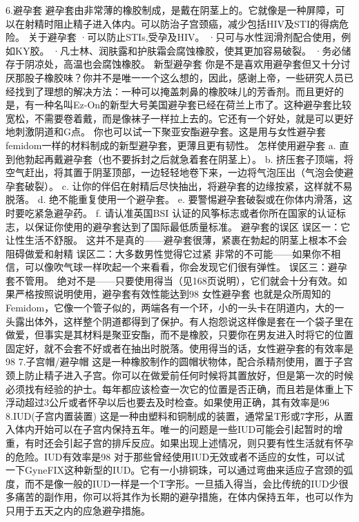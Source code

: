 \documentclass[12pt,UTF8]{ctexbook}
\begin{document}
6.避孕套
避孕套由非常薄的橡胶制成，是戴在阴茎上的。它就像是一种屏障，可以在射精时阻止精子进入体内。可以防治子宫颈癌，减少包括HIV及STI的得病危险。
关于避孕套
·可以防止STIs,受孕及HIV。
·只可与水性润滑剂配合使用，例如KY胶。
·凡士林、润肤露和护肤霜会腐蚀橡胶，使其更加容易破裂。
·务必储存于阴凉处，高温也会腐蚀橡胶。
新型避孕套
你是不是喜欢用避孕套但又十分讨厌那股子橡胶味？你并不是唯一一个这么想的，因此，感谢上帝，一些研究人员已经找到了理想的解决方法：一种可以掩盖刺鼻的橡胶味儿的芳香剂。而且更好的是，有一种名叫Ez-On的新型大号美国避孕套已经在荷兰上市了。这种避孕套比较宽松，不需要卷着戴，而是像袜子一样拉上去的。它还有一个好处，就是可以更好地刺激阴道和G点。
你也可以试一下聚亚安酯避孕套。这是用与女性避孕套femidom一样的材料制成的新型避孕套，更薄且更有韧性。
怎样使用避孕套
a. 直到他勃起再戴避孕套（也不要拆封之后就急着套在阴茎上）。
b. 挤压套子顶端，将空气赶出，将其置于阴茎顶部，一边轻轻地卷下来，一边将气泡压出（气泡会使避孕套破裂）。
c. 让你的伴侣在射精后尽快抽出，将避孕套的边缘按紧，这样就不易脱落。
d. 绝不能重复使用一个避孕套。
e. 要警惕避孕套破裂或在你体内滑落，这时要吃紧急避孕药。
f. 请认准英国BSI 认证的风筝标志或者你所在国家的认证标志，以保证你使用的避孕套达到了国际最低质量标准。
避孕套的误区
误区一：它让性生活不舒服。
这并不是真的——避孕套很薄，紧裹在勃起的阴茎上根本不会阻碍做爱和射精
误区二：大多数男性觉得它过紧
非常的不可能——如果你不相信，可以像吹气球一样吹起一个来看看，你会发现它们很有弹性。
误区三：避孕套不管用。
绝对不是——只要使用得当（见168页说明），它们就会十分有效。如果严格按照说明使用，避孕套有效性能达到98%
女性避孕套
也就是众所周知的Femidom，它像一个管子似的，两端各有一个环，小的一头卡在阴道内，大的一头露出体外，这样整个阴道都得到了保护。有人抱怨说这样像是套在一个袋子里在做爱，但事实是其材料是聚亚安酯，而不是橡胶，只要你在男友进入时将它的位置固定好，就不会套不好或者在抽出时脱落。使用得当的话，女性避孕套的有效率是98%
7.子宫帽/避孕帽
这是一种橡胶制作的圆帽状物体，配合杀精剂使用，置于子宫颈上防止精子进入子宫。你可以在做爱前任何时候将其置放好，但是第一次的时候必须找有经验的护士。每年都应该检查一次它的位置是否正确，而且若是体重上下浮动超过3公斤或者怀孕以后也要去及时检查。如果使用正确，其有效率是96%
8.IUD(子宫内置装置)
这是一种由塑料和铜制成的装置，通常呈T形或7字形，从置入体内开始可以在子宫内保持五年。唯一的问题是一些IUD可能会引起暂时的增重，有时还会引起子宫的排斥反应。如果出现上述情况，则只要有性生活就有怀孕的危险。IUD有效率是98%
对于那些曾经使用IUD无效或者不适应的女性，可以试一下GyneFIX这种新型的IUD。它有一小排铜珠，可以通过弯曲来适应子宫颈的弧度，而不是像一般的IUD一样是一个T字形。一旦插入得当，会比传统的IUD少很多痛苦的副作用，你可以将其作为长期的避孕措施，在体内保持五年，也可以作为只用于五天之内的应急避孕措施。
\end{document}
